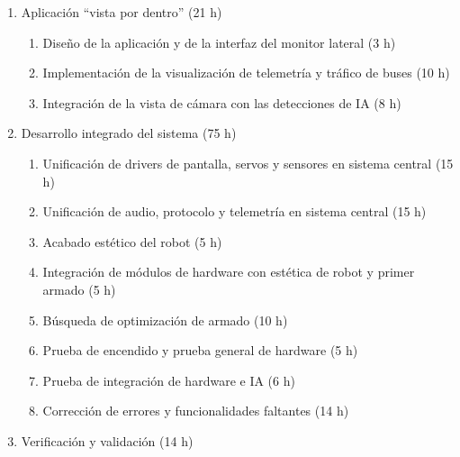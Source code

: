 \documentclass[
11pt, %
]{charter}
\begin{document}
\begin{enumerate}
\begin{enumerate}
		\item Investigación y selección de modelos preentrenados de reconocimiento y síntesis de voz (3 h)
		\item Desarrollo de sistema de detección y conteo de personas (4 h)
		\item Desarrollo de sistema de reconocimiento de voz y comandos (6 h)
		\item Desarrollo de sistema de síntesis de voz (4 h)
		\item Desarrollo de módulo de software del protocolo de comunicación propio del robot (2 h)
		\item Desarrollo de software de módulo IA externo del robot (2 h)
		\item Desarrollo de tests de software de módulo IA externo del robot (6 h)
	\end{enumerate}
\item Aplicación ``vista por dentro'' (21 h)
	\begin{enumerate}
		\item Diseño de la aplicación y de la interfaz del monitor lateral (3 h)
		\item Implementación de la visualización de telemetría y tráfico de buses (10 h)
		\item Integración de la vista de cámara con las detecciones de IA (8 h)
	\end{enumerate}
\item Desarrollo integrado del sistema (75 h)
	\begin{enumerate}
		\item Unificación de drivers de pantalla, servos y sensores en sistema central (15 h)
		\item Unificación de audio, protocolo y telemetría en sistema central (15 h)
		\item Acabado estético del robot (5 h)
		\item Integración de módulos de hardware con estética de robot y primer armado (5 h)
		\item Búsqueda de optimización de armado (10 h)
		\item Prueba de encendido y prueba general de hardware (5 h)
		\item Prueba de integración de hardware e IA (6 h)
		\item Corrección de errores y funcionalidades faltantes (14 h)
	\end{enumerate}
\item Verificación y validación (14 h)
	\begin{enumerate}

\end{enumerate}
\end{enumerate}
\end{document}
